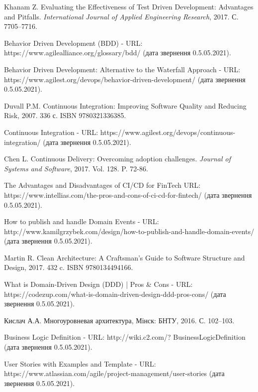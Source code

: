 \begin{thebibliography}{00}
			Khanam Z.
			Evaluating the Effectiveness of Test Driven Development: Advantages and Pitfalls.
      \emph{International Journal of Applied Engineering Research},
      2017. С. 7705–7716.
	
			Behavior Driven Development (BDD) -
			URL: https://www.agilealliance.org/glossary/bdd/
			(дата звернення 0.5.05.2021).

			Behavior Driven Development: Alternative to the Waterfall Approach -
			URL: https://www.agilest.org/devops/behavior-driven-development/
			(дата звернення 0.5.05.2021).
	
			Duvall P.M. 
			Continuous Integration: Improving Software Quality and Reducing Risk,
			2007. 336 с. ISBN 9780321336385.
	
			Continuous Integration -
			URL: https://www.agilest.org/devops/continuous-integration/
			(дата звернення 0.5.05.2021).

      Chen L.
      Continuous Delivery: Overcoming adoption challenges.
      \emph{Journal of Systems and Software},
      2017. Vol. 128. P. 72-86.

      The Advantages and Disadvantages of CI/CD for FinTech
      URL: https://www.intellias.com/the-pros-and-cons-of-ci-cd-for-fintech/
			(дата звернення 0.5.05.2021).
	
			How to publish and handle Domain Events -
			URL: http://www.kamilgrzybek.com/design/how-to-publish-and-handle-domain-events/
			(дата звернення 0.5.05.2021).

			Martin R.
			Clean Architecture: A Craftsman's Guide to Software Structure and Design,
			2017. 432 c. ISBN 9780134494166.
	
			What is Domain-Driven Design (DDD) | Pros \& Cons -
			URL: https://codezup.com/what-is-domain-driven-design-ddd-pros-cons/
			(дата звернення 0.5.05.2021).
	
			Кислач А.А.
			Многоуровневая архитектура,
			Мінск: БНТУ, 2016. С. 102–103.
	
			Business Logic Definition -
			URL: http://wiki.c2.com/?
      BusinessLogicDefinition (дата звернення 0.5.05.2021).
	
			User Stories with Examples and Template -
			URL: https://www.atlassian.com/agile/project-management/user-stories
			(дата звернення 0.5.05.2021).


\end{thebibliography}
